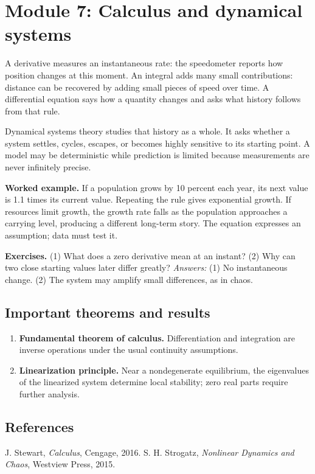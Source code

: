 \documentclass[11pt,oneside]{book}
\makeatletter
\renewenvironment{thebibliography}[1]
  {\list{\@biblabel{\@arabic\c@enumiv}}%
    {\settowidth\labelwidth{\@biblabel{#1}}%
     \leftmargin\labelwidth
     \advance\leftmargin\labelsep
     \usecounter{enumiv}%
     \let\p@enumiv\@empty
     \renewcommand\theenumiv{\@arabic\c@enumiv}}}
  {\endlist}
\makeatother
\begin{document}
\chapter[Module 7: Calculus and dynamics]{Module 7: Calculus and dynamical systems}
A derivative measures an instantaneous rate: the speedometer reports how position changes at this moment. An integral adds many small contributions: distance can be recovered by adding small pieces of speed over time. A differential equation says how a quantity changes and asks what history follows from that rule.

Dynamical systems theory studies that history as a whole. It asks whether a system settles, cycles, escapes, or becomes highly sensitive to its starting point. A model may be deterministic while prediction is limited because measurements are never infinitely precise.

\textbf{Worked example.} If a population grows by 10 percent each year, its next value is 1.1 times its current value. Repeating the rule gives exponential growth. If resources limit growth, the growth rate falls as the population approaches a carrying level, producing a different long-term story. The equation expresses an assumption; data must test it.

\textbf{Exercises.} (1) What does a zero derivative mean at an instant? (2) Why can two close starting values later differ greatly? \emph{Answers:} (1) No instantaneous change. (2) The system may amplify small differences, as in chaos.

\section*{Important theorems and results}
\begin{enumerate}[leftmargin=*,itemsep=0.35em]
\item \textbf{Fundamental theorem of calculus.} Differentiation and integration are inverse operations under the usual continuity assumptions.

\item \textbf{Linearization principle.} Near a nondegenerate equilibrium, the eigenvalues of the linearized system determine local stability; zero real parts require further analysis.
\end{enumerate}

\section*{References}
\begin{thebibliography}{9}
 J. Stewart, \emph{Calculus}, Cengage, 2016.
 S. H. Strogatz, \emph{Nonlinear Dynamics and Chaos}, Westview Press, 2015.
\end{thebibliography}
\end{document}
